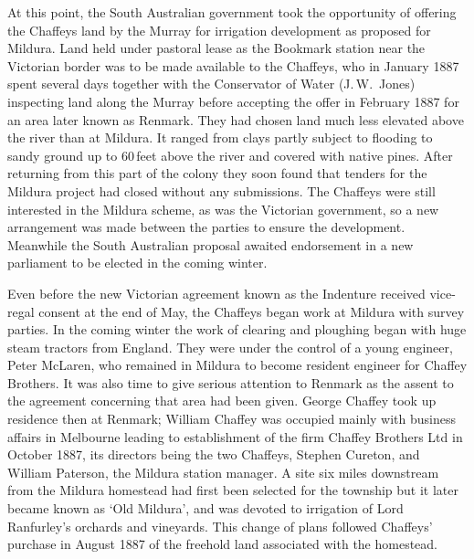 At this point, the South Australian government took the opportunity of
offering the Chaffeys land by the Murray for irrigation development as
proposed for Mildura.  Land held under pastoral lease as the Bookmark
station  near the Victorian border was to be
made available to the Chaffeys, who in January 1887 spent several days
together with the Conservator of Water (J.\,W.~Jones)  inspecting land along the Murray before accepting the offer in
February 1887 for an area later known as Renmark.  They had chosen land much less elevated above the river than at
Mildura.  It ranged from clays partly subject to flooding
to sandy ground up to 60\,feet above the river and covered with native
pines.  After returning from this part of the colony they soon found
that tenders for the Mildura  project had closed
without any submissions.  The Chaffeys were still interested in the
Mildura scheme, as was the Victorian government, so a new arrangement
was made between the parties to ensure the development.  Meanwhile the
South Australian proposal awaited endorsement in a new parliament to
be elected in the coming winter.

Even before the new Victorian agreement known as the Indenture
received vice-regal consent at the end of May, the Chaffeys began work
at Mildura with survey parties.  In the coming winter the work of
clearing and ploughing began with huge steam tractors from England.
They were under the control of a young engineer, Peter McLaren,
 who remained in Mildura to become resident
engineer for Chaffey Brothers.  It was also time to give serious
attention to Renmark as the assent to the agreement concerning that
area had been given.  George Chaffey took up residence then at
Renmark; William Chaffey was occupied mainly with business affairs in
Melbourne leading to establishment of the firm Chaffey Brothers Ltd in
October 1887, its directors being the two Chaffeys, Stephen Cureton,
\index{Cureton, S.} and William Paterson, \index{Paterson, W.} the
Mildura station manager.  A site six miles downstream from the Mildura
homestead had first been selected for the township but it later became
known as `Old Mildura', and was devoted to irrigation of Lord
Ranfurley's  orchards and
vineyards.  This change of plans followed Chaffeys'
purchase in August 1887 of the freehold land associated with the
homestead.

